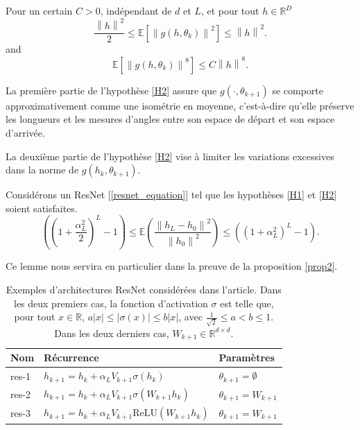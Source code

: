 \begin{assumption}\label{H2}
    Pour un certain $ C > 0 $, indépendant de $ d $ et $ L $, et pour tout $ h \in \mathbb{R}^D  $ 
    \[
        \frac{\left\| h \right\| ^2}{2 } \leq  \mathbb{E }[ \left\|  g(h, \theta _ k ) \right\| ^2 ] \leq \left\| h \right\| ^2
    .\]
    and
    \[
        \mathbb{E } [\left\| g(h, \theta _k)  \right\| ^8 ]\leq C \left\| h  \right\| ^8
    .\]
\end{assumption}
\begin{note}
    La première partie de l'hypothèse \ref{H2} assure que $g(\cdot, \theta_{k+1})$ se comporte approximativement comme une isométrie en moyenne, c'est-à-dire qu'elle préserve les longueurs et les mesures d'angles entre son espace de départ et son espace d'arrivée.

    La deuxième partie de l'hypothèse \ref{H2} vise à limiter les variations excessives dans la norme de $g(h_k, \theta_{k+1})$.
\end{note}

\begin{lem}[Admis]\label{lem14}
    Considérons un ResNet [\ref{resnet_equation}] tel que les hypothèses \ref{H1} et \ref{H2} soient satisfaites.
    \[
        ((1 + \frac{\alpha _L ^2 }{2 }) ^L - 1) \leq \mathbb{E}( \frac{\left\| h_L - h_0 \right\| ^2 }{\left\| h_0 \right\| ^2}) \leq ((1 + \alpha _L ^2 ) ^L - 1 )
    .\]
\end{lem}
Ce lemme nous servira en particulier dans la preuve de la proposition \ref{prop2}.


\begin{table}[h]
    \centering
    \begin{tabular}{lll}
        \hline
        \textbf{Nom} & \textbf{Récurrence} & \textbf{Paramètres} \\ \hline
        res-1 & \( h_{k+1} = h_k + \alpha_L V_{k+1}\sigma(h_k) \) & \( \theta_{k+1} = \emptyset \) \\
        res-2 & \( h_{k+1} = h_k + \alpha_L V_{k+1}\sigma(W_{k+1}h_k) \) & \( \theta_{k+1} = W_{k+1} \) \\
        res-3 & \( h_{k+1} = h_k + \alpha_L V_{k+1}\text{ReLU}(W_{k+1}h_k) \) & \( \theta_{k+1} = W_{k+1} \) \\ \hline
    \end{tabular}
    \caption{Exemples d'architectures ResNet considérées dans l'article. Dans les deux premiers cas, la fonction d'activation \( \sigma \) est telle que, pour tout \( x \in \mathbb{R} \), \( a|x| \leq |\sigma(x)| \leq b|x| \), avec \( \frac{1}{\sqrt{2}} \leq a < b \leq 1 \). Dans les deux derniers cas, \( W_{k+1} \in \mathbb{R}^{d \times d} \).}
    \label{tab:resnet_architectures}
\end{table}

